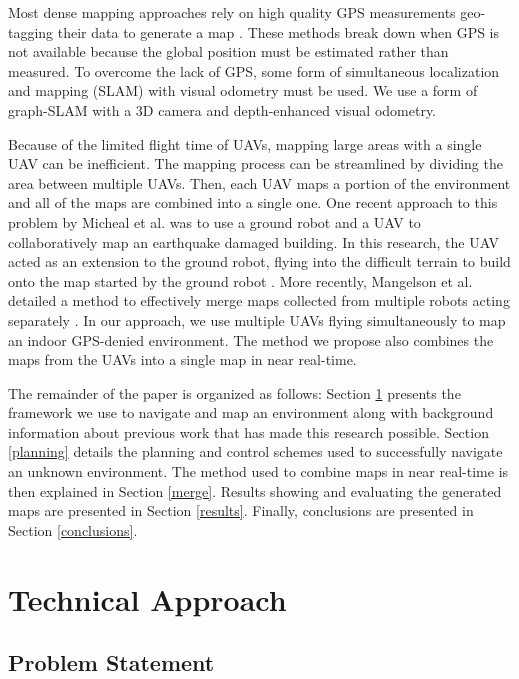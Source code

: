 \documentclass[letterpaper, 10 pt, conference]{ieeeconf}  %
\begin{document}
Most dense mapping approaches rely on high quality GPS measurements geo-tagging their data to generate a map \cite{Siebert2014, Martin2015}. These methods break down when GPS is not available because the global position must be estimated rather than measured. To overcome the lack of GPS, some form of simultaneous localization and mapping (SLAM) with visual odometry must be used. We use a form of graph-SLAM with a 3D camera and depth-enhanced visual odometry.

Because of the limited flight time of UAVs, mapping large areas with a single UAV can be inefficient. The mapping process can be streamlined by dividing the area between multiple UAVs. Then, each UAV maps a portion of the environment and all of the maps are combined into a single one. One recent approach to this problem by Micheal et al. was to use a ground robot and a UAV to collaboratively map an earthquake damaged building. In this research, the UAV acted as an extension to the ground robot, flying into the difficult terrain to build onto the map started by the ground robot \cite{Michael2012}. More recently, Mangelson et al. detailed a method to effectively merge maps collected from multiple robots acting separately \cite{Mangelson2018}. In our approach, we use multiple UAVs flying simultaneously to map an indoor GPS-denied environment. The method we propose also combines the maps from the UAVs into a single map in near real-time.

The remainder of the paper is organized as follows: Section \ref{approach} presents the framework we use to navigate and map an environment along with background information about previous work that has made this research possible. Section \ref{planning} details the planning and control schemes used to successfully navigate an unknown environment. The method used to combine maps in near real-time is then explained in Section \ref{merge}. Results showing and evaluating the generated maps are presented in Section \ref{results}. Finally, conclusions are presented in Section \ref{conclusions}.

\section{Technical Approach}\label{approach}

\subsection{Problem Statement}
\end{document}
